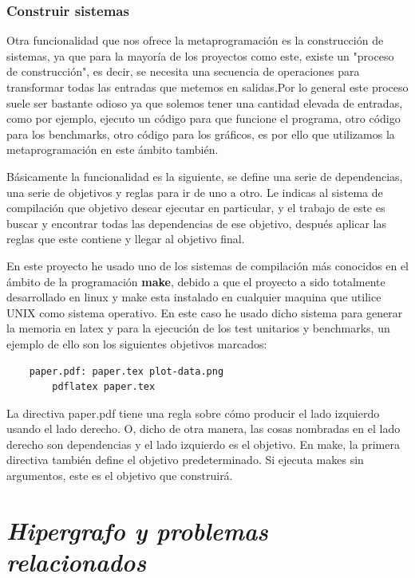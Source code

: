 \documentclass{cosas/tfg_domingo}
\begin{document}
\subsection{Construir sistemas}
Otra funcionalidad que nos ofrece la metaprogramación es la construcción de sistemas, ya que para la mayoría de los proyectos como este, existe un "proceso de construcción", es decir, se necesita una secuencia de operaciones para transformar todas las entradas que metemos en salidas.Por lo general este proceso suele ser bastante odioso ya que solemos tener una cantidad elevada de entradas, como por ejemplo, ejecuto un código para que funcione el programa, otro código para los benchmarks, otro código para los gráficos, es por ello que utilizamos la metaprogramación en este ámbito también. \citep{metaprogramming}

Básicamente la funcionalidad es la siguiente, se define una serie de dependencias, una serie de objetivos y reglas para ir de uno a otro. Le indicas al sistema de compilación que objetivo desear ejecutar en particular, y el trabajo de este es buscar y encontrar todas las dependencias de ese objetivo, después aplicar las reglas que este contiene y llegar al objetivo final.

En este proyecto he usado uno de los sistemas de compilación más conocidos en el ámbito de la programación \textbf{make}, debido a que el proyecto a sido totalmente desarrollado en linux y make esta instalado en cualquier maquina que utilice UNIX como sistema operativo. En este caso he usado dicho sistema para generar la memoria en latex y para la ejecución de los test unitarios y benchmarks, un ejemplo de ello son los siguientes objetivos marcados:

\begin{verbatim}
    paper.pdf: paper.tex plot-data.png
	    pdflatex paper.tex
\end{verbatim}

La directiva paper.pdf tiene una regla sobre cómo producir el lado izquierdo usando el lado derecho. O, dicho de otra manera, las cosas nombradas en el lado derecho son dependencias y el lado izquierdo es el objetivo. En make, la primera directiva también define el objetivo predeterminado. Si ejecuta makes sin argumentos, este es el objetivo que construirá.

\chapter{\emph{Hipergrafo y problemas relacionados}}
\end{document}
